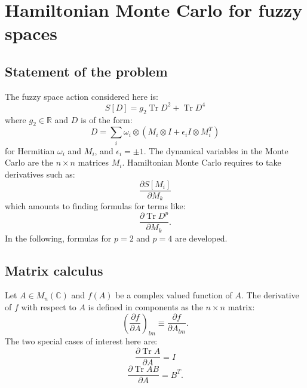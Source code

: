 \documentclass[12pt,a4paper]{article}
\DeclareMathOperator{\Tr}{Tr}
\begin{document}
\section{Hamiltonian Monte Carlo for fuzzy spaces}
\subsection{Statement of the problem}
The fuzzy space action considered here is:
\begin{equation}
S[D] = g_2 \Tr D^2 + \Tr D^4
\end{equation} 
where $g_2 \in \mathbb{R}$ and $D$ is of the form:
\begin{equation}
D = \sum_i \omega_i \otimes (M_i \otimes I + \epsilon_i I \otimes M_i^T)
\end{equation}
for Hermitian $\omega_i$ and $M_i$, and $\epsilon_i = \pm 1$. \newline
The dynamical variables in the Monte Carlo are the $n \times n$ matrices $M_i$. Hamiltonian Monte Carlo requires to take derivatives such as:
\begin{equation}
\frac{\partial S[M_i]}{\partial M_k}
\end{equation}
which amounts to finding formulas for terms like:
\begin{equation}
\frac{\partial \Tr D^p}{\partial M_k}.
\end{equation}
In the following, formulas for $p=2$ and $p=4$ are developed.


\subsection{Matrix calculus}
Let $A \in M_n(\mathbb{C})$ and $f(A)$ be a complex valued function of $A$. The derivative of $f$ with respect to $A$ is defined in components as the $n \times n$ matrix:
\begin{equation}
\left(\frac{\partial f}{\partial A}\right)_{lm} \equiv \frac{\partial f}{\partial A_{lm}}.
\end{equation}
The two special cases of interest here are:
\begin{equation}
\frac{\partial \Tr A}{\partial A} = I
\end{equation}
\begin{equation}
\frac{\partial \Tr AB}{\partial A} = B^T.
\end{equation}
\end{document}
